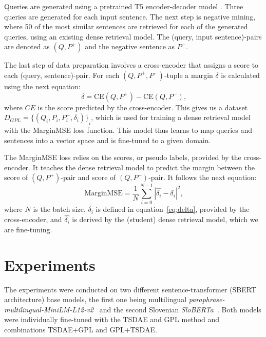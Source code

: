 \documentclass[fleqn,moreauthors,10pt]{ds_report}
\begin{document}
Queries are generated using a pretrained T5 encoder-decoder model \cite{T5}. Three queries are generated for each input sentence. The next step is negative mining, where 50 of the most similar sentences are retrieved for each of the generated queries, using an existing dense retrieval model. The (query, input sentence)-pairs are denoted as $(Q, P^{+})$ and the negative sentence as $P^{-}$.

The last step of data preparation involves a cross-encoder that assigns a score to each (query, sentence)-pair. For each $(Q, P^{+}, P^{-})$-tuple a margin $\delta$ is calculated using the next equation:
\begin{equation}
	\delta = \text{CE}(Q, P^{+}) - \text{CE}(Q, P^{-})\text{,}
\label{eq:delta}
\end{equation}
where $CE$ is the score predicted by the cross-encoder. This gives us a dataset $D_{GPL} = {\{ ( Q_i, P_i, P_i^{-}, \delta_i ) \}}_i$, which is used for training a dense retrieval model with the MarginMSE loss function. This model thus learns to map queries and sentences into a vector space and is fine-tuned to a given domain.

The MarginMSE loss \cite{marginMSE} relies on the scores, or pseudo labels, provided by the cross-encoder. It teaches the dense retrieval model to predict the margin between the score of $(Q, P^{+})$-pair and score of $(Q, P^{-})$-pair. It follows the next equation:
\begin{equation}
	\text{MarginMSE} = \frac{1}{N} \sum_{i=0}^{N-1} |\hat{\delta_i} - \delta_i|^{2} \text{,}
\label{eq:margin}
\end{equation}
where $N$ is the batch size, $\delta_i$ is defined in equation~\ref{eq:delta}, provided by the cross-encoder, and $\hat{\delta_i}$ is derived by the (student) dense retrieval model, which we are fine-tuning.





\section*{Experiments}
The experiments were conducted on two different sentence-transformer (SBERT architecture) base models, the first one being multilingual {\it paraphrase-multilingual-MiniLM-L12-v2}~\cite{reimers-2019-sentence-bert} and the second Slovenian {\it SloBERTa}~\cite{sloberta}. Both models were individually fine-tuned with the TSDAE and GPL method and combinations TSDAE+GPL and GPL+TSDAE.
\end{document}
